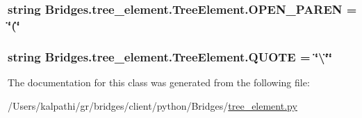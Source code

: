 \subsubsection[{O\+P\+E\+N\+\_\+\+P\+A\+R\+E\+N}]{\setlength{\rightskip}{0pt plus 5cm}string Bridges.\+tree\+\_\+element.\+Tree\+Element.\+O\+P\+E\+N\+\_\+\+P\+A\+R\+E\+N = \char`\"{}(\char`\"{}\hspace{0.3cm}{\ttfamily [static]}}\label{class_bridges_1_1tree__element_1_1_tree_element_af79b871189bd339d5f7e9d49c4eac947}
\hypertarget{class_bridges_1_1tree__element_1_1_tree_element_af14308b7ca08bea361da3578def2fbd3}{}
\subsubsection[{Q\+U\+O\+T\+E}]{\setlength{\rightskip}{0pt plus 5cm}string Bridges.\+tree\+\_\+element.\+Tree\+Element.\+Q\+U\+O\+T\+E = \char`\"{}\textbackslash{}\char`\"{}\char`\"{}\hspace{0.3cm}{\ttfamily [static]}}\label{class_bridges_1_1tree__element_1_1_tree_element_af14308b7ca08bea361da3578def2fbd3}


The documentation for this class was generated from the following file\+:\begin{DoxyCompactItemize}
\item 
/\+Users/kalpathi/gr/bridges/client/python/\+Bridges/\hyperlink{tree__element_8py}{tree\+\_\+element.\+py}\end{DoxyCompactItemize}
